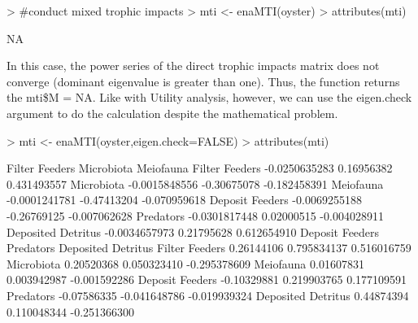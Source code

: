 \documentclass[article]{jss}
\begin{document}
\begin{Schunk}
\begin{Sinput}
>                                         #conduct mixed trophic impacts
> mti <- enaMTI(oyster)
> attributes(mti)
\end{Sinput}
\begin{Soutput}
[1] NA
\end{Soutput}
\end{Schunk}

In this case, the power series of the direct trophic impacts matrix
does not converge (dominant eigenvalue is greater than one).  Thus,
the function returns the mti\$M = NA.  Like with Utility analysis,
however, we can use the eigen.check argument to do the calculation
despite the mathematical problem.

\begin{Schunk}
\begin{Sinput}
>   mti <- enaMTI(oyster,eigen.check=FALSE)
> attributes(mti)
\end{Sinput}
\begin{Soutput}
                   Filter Feeders  Microbiota    Meiofauna
Filter Feeders      -0.0250635283  0.16956382  0.431493557
Microbiota          -0.0015848556 -0.30675078 -0.182458391
Meiofauna           -0.0001241781 -0.47413204 -0.070959618
Deposit Feeders     -0.0069255188 -0.26769125 -0.007062628
Predators           -0.0301817448  0.02000515 -0.004028911
Deposited Detritus  -0.0034657973  0.21795628  0.612654910
                   Deposit Feeders    Predators Deposited Detritus
Filter Feeders          0.26144106  0.795834137        0.516016759
Microbiota              0.20520368  0.050323410       -0.295378609
Meiofauna               0.01607831  0.003942987       -0.001592286
Deposit Feeders        -0.10329881  0.219903765        0.177109591
Predators              -0.07586335 -0.041648786       -0.019939324
Deposited Detritus      0.44874394  0.110048344       -0.251366300
\end{Soutput}
\end{Schunk}
\end{document}
